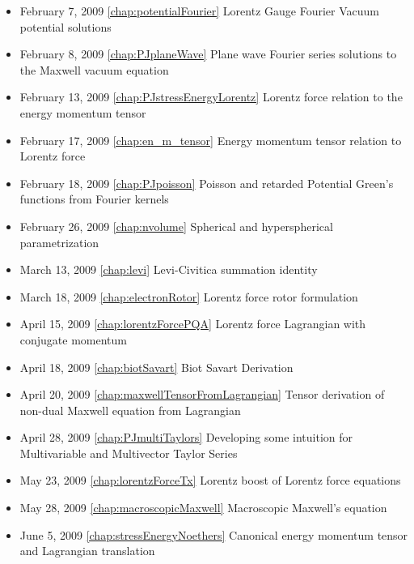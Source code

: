 \begin{itemize}
\item February 7, 2009 \ref{chap:potentialFourier} Lorentz Gauge Fourier Vacuum potential solutions

\item February 8, 2009 \ref{chap:PJplaneWave} Plane wave Fourier series solutions to the Maxwell vacuum equation

\item February 13, 2009 \ref{chap:PJstressEnergyLorentz} Lorentz force relation to the energy momentum tensor

\item February 17, 2009 \ref{chap:en_m_tensor} Energy momentum tensor relation to Lorentz force

\item February 18, 2009 \ref{chap:PJpoisson} Poisson and retarded Potential Green's functions from Fourier kernels

\item February 26, 2009 \ref{chap:nvolume} Spherical and hyperspherical parametrization

\item March 13, 2009 \ref{chap:levi} Levi-Civitica summation identity

\item March 18, 2009 \ref{chap:electronRotor} Lorentz force rotor formulation

\item April 15, 2009 \ref{chap:lorentzForcePQA} Lorentz force Lagrangian with conjugate momentum

\item April 18, 2009 \ref{chap:biotSavart} Biot Savart Derivation

\item April 20, 2009 \ref{chap:maxwellTensorFromLagrangian} Tensor derivation of non-dual Maxwell equation from Lagrangian

\item April 28, 2009 \ref{chap:PJmultiTaylors} Developing some intuition for Multivariable and Multivector Taylor Series

\item May 23, 2009 \ref{chap:lorentzForceTx} Lorentz boost of Lorentz force equations

\item May 28, 2009 \ref{chap:macroscopicMaxwell} Macroscopic Maxwell's equation

\item June 5, 2009 \ref{chap:stressEnergyNoethers} Canonical energy momentum tensor and Lagrangian translation

\end{itemize}

